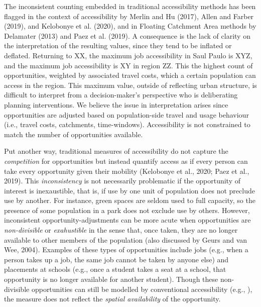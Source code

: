 \documentclass[]{elsarticle} %
\begin{document}
The inconsistent counting embedded in traditional accessibility methods
has been flagged in the context of accessibility by Merlin and Hu
(2017), Allen and Farber (2019), and Kelobonye et al. (2020), and in
Floating Catchment Area methods by Delamater (2013) and Paez et al.
(2019). A consequence is the lack of clarity on the interpretation of
the resulting values, since they tend to be inflated or deflated.
Returning to XX, the maximum job accessibility in Saul Paulo is XYZ, and
the maximum job accessibility is XY in region ZZ. This the highest count
of opportunities, weighted by associated travel costs, which a certain
population can access in the region. This maximum value, outside of
reflecting urban structure, is difficult to interpret from a
decision-maker's perspective who is deliberating planning interventions.
We believe the issue in interpretation arises since opportunities are
adjusted based on population-side travel and usage behaviour (i.e.,
travel costs, catchments, time-windows). Accessibility is not
constrained to match the number of opportunities available.

Put another way, traditional measures of accessibility do not capture
the \emph{competition} for opportunities but instead quantify access as
if every person can take every opportunity given their mobility
(Kelobonye et al., 2020; Paez et al., 2019). This \emph{inconsistency}
is not necessarily problematic if the opportunity of interest is
inexaustible, that is, if use by one unit of population does not
preclude use by another. For instance, green spaces are seldom used to
full capacity, so the presence of some population in a park does not
exclude use by others. However, inconsistent opportunity-adjustments can
be more acute when opportunities are \emph{non-divisible} or
\emph{exahustible} in the sense that, once taken, they are no longer
available to other members of the population (also discussed by Geurs
and van Wee, 2004). Examples of these types of opportunities include
jobs (e.g., when a person takes up a job, the same job cannot be taken
by anyone else) and placements at schools (e.g., once a student takes a
seat at a school, that opportunity is no longer available for another
student). Though these non-divisible opportunities can still be modelled
by conventional accessibility (e.g., ), the measure does not reflect the
\emph{spatial availability} of the opportunity.
\end{document}
